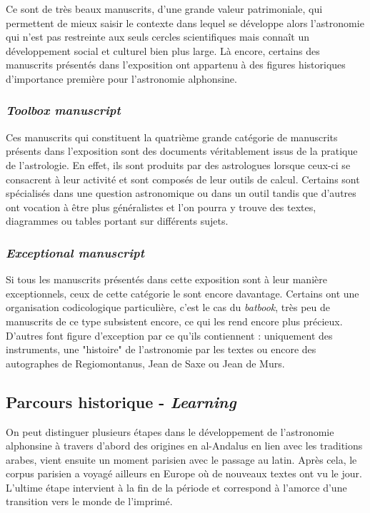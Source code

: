     Ce sont de très beaux manuscrits, d’une grande valeur patrimoniale, qui permettent de mieux saisir le contexte dans lequel se développe alors l'astronomie qui n'est pas restreinte aux seuls cercles scientifiques mais connaît un développement social et culturel bien plus large. Là encore, certains des manuscrits présentés dans l'exposition ont appartenu à des figures historiques d'importance première pour l'astronomie alphonsine. 

	\subsubsection{\textit{Toolbox manuscript}}
	Ces manuscrits qui constituent la quatrième grande catégorie de manuscrits présents dans l'exposition sont des documents véritablement issus de la pratique de l'astrologie. En effet, ils sont produits par des astrologues lorsque ceux-ci se consacrent à leur activité et sont composés de leur outils de calcul. Certains sont spécialisés dans une question astronomique ou dans un outil tandis que d'autres ont vocation à être plus généralistes et l'on pourra y trouve des textes, diagrammes ou tables portant sur différents sujets. 
	
	\subsubsection{\textit{Exceptional manuscript}}
	Si tous les manuscrits présentés dans cette exposition sont à leur manière exceptionnels, ceux de cette catégorie le sont encore davantage. Certains ont une organisation codicologique particulière, c'est le cas du \textit{batbook}, très peu de manuscrits de ce type subsistent encore, ce qui les rend encore plus précieux. D'autres font figure d'exception par ce qu'ils contiennent : uniquement des instruments, une "histoire" de l'astronomie par les textes ou encore des autographes de Regiomontanus, Jean de Saxe ou Jean de Murs.

	\subsection{Parcours historique - \textit{Learning}}
	On peut distinguer plusieurs étapes dans le développement de l'astronomie alphonsine à travers d'abord des origines en al-Andalus en lien avec les traditions arabes, vient ensuite un moment parisien avec le passage au latin. Après cela, le corpus parisien a voyagé ailleurs en Europe où de nouveaux textes ont vu le jour. L'ultime étape intervient à la fin de la période et correspond à l'amorce d'une transition vers le monde de l'imprimé. 

